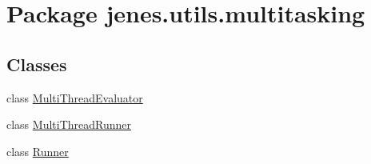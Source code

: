 \hypertarget{namespacejenes_1_1utils_1_1multitasking}{\section{Package jenes.\-utils.\-multitasking}
\label{namespacejenes_1_1utils_1_1multitasking}
}
\subsection*{Classes}
\begin{DoxyCompactItemize}
\item 
class \hyperlink{classjenes_1_1utils_1_1multitasking_1_1_multi_thread_evaluator}{Multi\-Thread\-Evaluator}
\item 
class \hyperlink{classjenes_1_1utils_1_1multitasking_1_1_multi_thread_runner}{Multi\-Thread\-Runner}
\item 
class \hyperlink{classjenes_1_1utils_1_1multitasking_1_1_runner}{Runner}
\end{DoxyCompactItemize}
